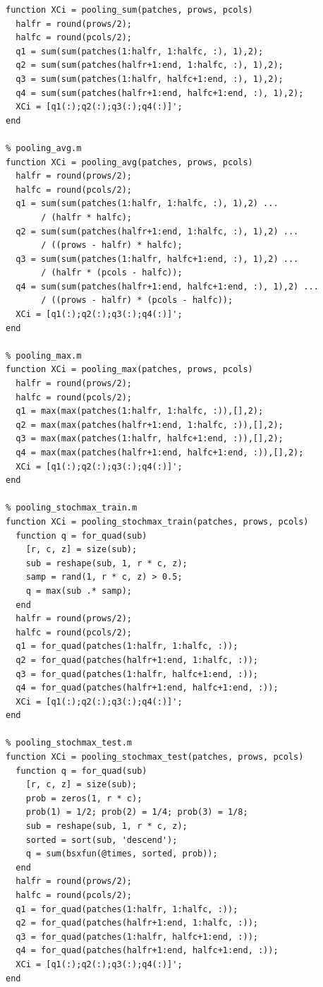 \documentclass[a4paper,9pt,hidelinks]{article}
\begin{document}
\begin{lstlisting}[basicstyle=\small]
% pooling_sum.m
function XCi = pooling_sum(patches, prows, pcols)
  halfr = round(prows/2);
  halfc = round(pcols/2);
  q1 = sum(sum(patches(1:halfr, 1:halfc, :), 1),2);
  q2 = sum(sum(patches(halfr+1:end, 1:halfc, :), 1),2);
  q3 = sum(sum(patches(1:halfr, halfc+1:end, :), 1),2);
  q4 = sum(sum(patches(halfr+1:end, halfc+1:end, :), 1),2);
  XCi = [q1(:);q2(:);q3(:);q4(:)]';
end

% pooling_avg.m
function XCi = pooling_avg(patches, prows, pcols)
  halfr = round(prows/2);
  halfc = round(pcols/2);
  q1 = sum(sum(patches(1:halfr, 1:halfc, :), 1),2) ...
       / (halfr * halfc);
  q2 = sum(sum(patches(halfr+1:end, 1:halfc, :), 1),2) ...
       / ((prows - halfr) * halfc);
  q3 = sum(sum(patches(1:halfr, halfc+1:end, :), 1),2) ...
       / (halfr * (pcols - halfc));
  q4 = sum(sum(patches(halfr+1:end, halfc+1:end, :), 1),2) ...
       / ((prows - halfr) * (pcols - halfc));
  XCi = [q1(:);q2(:);q3(:);q4(:)]';
end

% pooling_max.m
function XCi = pooling_max(patches, prows, pcols)
  halfr = round(prows/2);
  halfc = round(pcols/2);
  q1 = max(max(patches(1:halfr, 1:halfc, :)),[],2);
  q2 = max(max(patches(halfr+1:end, 1:halfc, :)),[],2);
  q3 = max(max(patches(1:halfr, halfc+1:end, :)),[],2);
  q4 = max(max(patches(halfr+1:end, halfc+1:end, :)),[],2);
  XCi = [q1(:);q2(:);q3(:);q4(:)]';
end

% pooling_stochmax_train.m
function XCi = pooling_stochmax_train(patches, prows, pcols)
  function q = for_quad(sub)
    [r, c, z] = size(sub);
    sub = reshape(sub, 1, r * c, z);
    samp = rand(1, r * c, z) > 0.5;
    q = max(sub .* samp);
  end
  halfr = round(prows/2);
  halfc = round(pcols/2);
  q1 = for_quad(patches(1:halfr, 1:halfc, :));
  q2 = for_quad(patches(halfr+1:end, 1:halfc, :));
  q3 = for_quad(patches(1:halfr, halfc+1:end, :));
  q4 = for_quad(patches(halfr+1:end, halfc+1:end, :));
  XCi = [q1(:);q2(:);q3(:);q4(:)]';
end

% pooling_stochmax_test.m
function XCi = pooling_stochmax_test(patches, prows, pcols)
  function q = for_quad(sub)
    [r, c, z] = size(sub);
    prob = zeros(1, r * c);
    prob(1) = 1/2; prob(2) = 1/4; prob(3) = 1/8;
    sub = reshape(sub, 1, r * c, z);
    sorted = sort(sub, 'descend');
    q = sum(bsxfun(@times, sorted, prob));
  end
  halfr = round(prows/2);
  halfc = round(pcols/2);
  q1 = for_quad(patches(1:halfr, 1:halfc, :));
  q2 = for_quad(patches(halfr+1:end, 1:halfc, :));
  q3 = for_quad(patches(1:halfr, halfc+1:end, :));
  q4 = for_quad(patches(halfr+1:end, halfc+1:end, :));
  XCi = [q1(:);q2(:);q3(:);q4(:)]';
end


\end{lstlisting}
\end{document}

